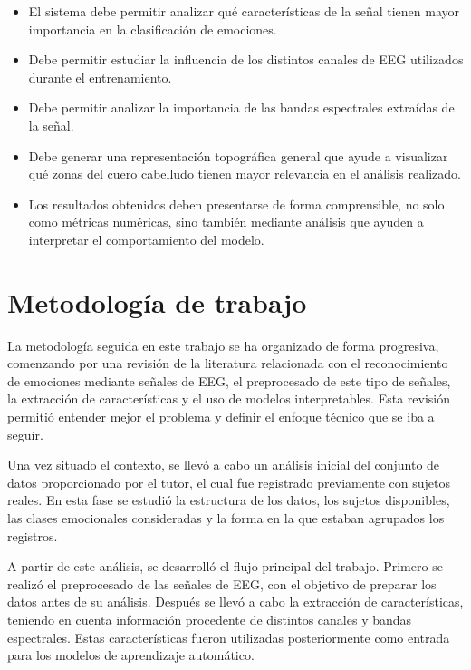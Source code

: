 \begin{itemize}
    \item El sistema debe permitir analizar qué características de la señal tienen mayor importancia en la clasificación de emociones.

    \item Debe permitir estudiar la influencia de los distintos canales de \ac{EEG} utilizados durante el entrenamiento.

    \item Debe permitir analizar la importancia de las bandas espectrales extraídas de la señal.

    \item Debe generar una representación topográfica general que ayude a visualizar qué zonas del cuero cabelludo tienen mayor relevancia en el análisis realizado.

    \item Los resultados obtenidos deben presentarse de forma comprensible, no solo como métricas numéricas, sino también mediante análisis que ayuden a interpretar el comportamiento del modelo.
\end{itemize}


\section{Metodología de trabajo}

La metodología seguida en este trabajo se ha organizado de forma progresiva, comenzando por una revisión de la literatura relacionada con el reconocimiento de emociones mediante señales de \ac{EEG}, el preprocesado de este tipo de señales, la extracción de características y el uso de modelos interpretables. Esta revisión permitió entender mejor el problema y definir el enfoque técnico que se iba a seguir.

Una vez situado el contexto, se llevó a cabo un análisis inicial del conjunto de datos proporcionado por el tutor, el cual fue registrado previamente con sujetos reales. En esta fase se estudió la estructura de los datos, los sujetos disponibles, las clases emocionales consideradas y la forma en la que estaban agrupados los registros.

A partir de este análisis, se desarrolló el flujo principal del trabajo. Primero se realizó el preprocesado de las señales de \ac{EEG}, con el objetivo de preparar los datos antes de su análisis. Después se llevó a cabo la extracción de características, teniendo en cuenta información procedente de distintos canales y bandas espectrales. Estas características fueron utilizadas posteriormente como entrada para los modelos de aprendizaje automático.

